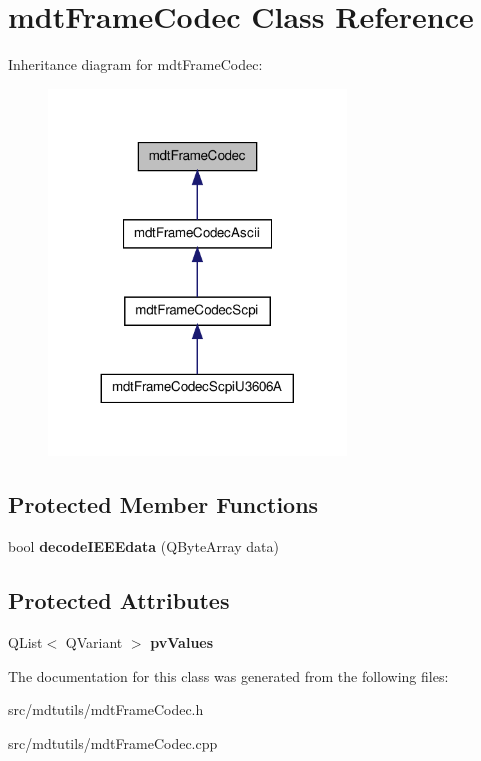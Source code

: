 \hypertarget{classmdt_frame_codec}{
\section{mdtFrameCodec Class Reference}
\label{classmdt_frame_codec}
}


Inheritance diagram for mdtFrameCodec:\nopagebreak
\begin{figure}[H]
\begin{center}
\leavevmode
\includegraphics[width=224pt]{classmdt_frame_codec__inherit__graph}
\end{center}
\end{figure}
\subsection*{Protected Member Functions}
\begin{DoxyCompactItemize}
\item 
\hypertarget{classmdt_frame_codec_a6a47e1739b13c72883a01f5dd4bcffb6}{
bool {\bfseries decodeIEEEdata} (QByteArray data)}
\label{classmdt_frame_codec_a6a47e1739b13c72883a01f5dd4bcffb6}

\end{DoxyCompactItemize}
\subsection*{Protected Attributes}
\begin{DoxyCompactItemize}
\item 
\hypertarget{classmdt_frame_codec_a3e7dc48b11dda3688f48eea2030f0953}{
QList$<$ QVariant $>$ {\bfseries pvValues}}
\label{classmdt_frame_codec_a3e7dc48b11dda3688f48eea2030f0953}

\end{DoxyCompactItemize}


The documentation for this class was generated from the following files:\begin{DoxyCompactItemize}
\item 
src/mdtutils/mdtFrameCodec.h\item 
src/mdtutils/mdtFrameCodec.cpp\end{DoxyCompactItemize}
